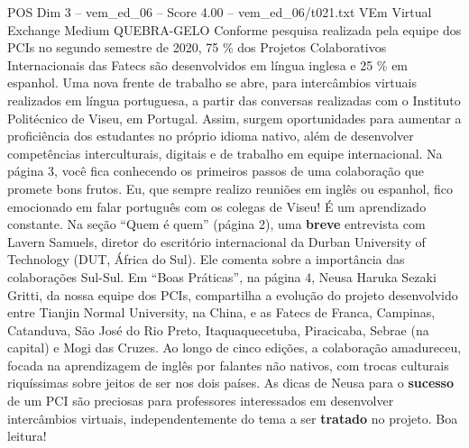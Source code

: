 \begin{textsample}{POS Dim 3 – vem\_ed\_06 – Score 4.00 – vem\_ed\_06/t021.txt}  \label{ex:f3_pos_127}
VEm Virtual Exchange Medium QUEBRA-GELO Conforme pesquisa realizada pela equipe dos PCIs no segundo semestre de 2020, 75 \% dos Projetos Colaborativos Internacionais das Fatecs são desenvolvidos em língua inglesa e 25 \% em espanhol.
Uma nova frente de trabalho se abre, para intercâmbios virtuais realizados em língua portuguesa, a partir das conversas realizadas com o Instituto Politécnico de Viseu, em Portugal.
Assim, surgem oportunidades para aumentar a proficiência dos estudantes no próprio idioma nativo, além de desenvolver competências interculturais, digitais e de trabalho em equipe internacional.
Na página 3, você fica conhecendo os primeiros passos de uma colaboração que promete bons frutos.
Eu, que sempre realizo reuniões em inglês ou espanhol, fico emocionado em falar português com os colegas de Viseu!
É um aprendizado constante.
Na seção “Quem é quem” (página 2), uma \textbf{breve} entrevista com Lavern Samuels, diretor do escritório internacional da Durban University of Technology (DUT, África do Sul).
Ele comenta sobre a importância das colaborações Sul-Sul.
Em “Boas Práticas”, na página 4, Neusa Haruka Sezaki Gritti, da nossa equipe dos PCIs, compartilha a evolução do projeto desenvolvido entre Tianjin Normal University, na China, e as Fatecs de Franca, Campinas, Catanduva, São José do Rio Preto, Itaquaquecetuba, Piracicaba, Sebrae (na capital) e Mogi das Cruzes.
Ao longo de cinco edições, a colaboração amadureceu, focada na aprendizagem de inglês por falantes não nativos, com trocas culturais riquíssimas sobre jeitos de ser nos dois países.
As dicas de Neusa para o \textbf{sucesso} de um PCI são preciosas para professores interessados em desenvolver intercâmbios virtuais, independentemente do tema a ser \textbf{tratado} no projeto.
Boa leitura!

\end{textsample}
